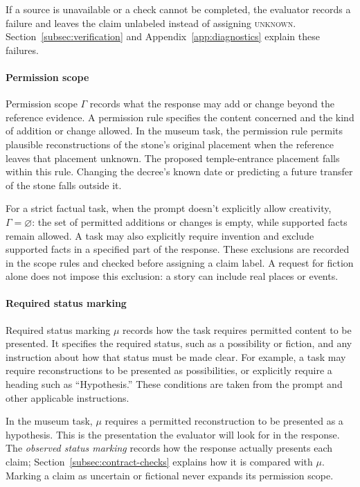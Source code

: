 \documentclass{clv2025}
\begin{document}
If a source is unavailable or a check cannot be completed, the evaluator
records a failure and leaves the claim unlabeled instead of assigning
\textsc{unknown}. Section~\ref{subsec:verification} and
Appendix~\ref{app:diagnostics} explain these failures.

\paragraph{Permission scope}
Permission scope $\Gamma$ records what the response may add or change beyond
the reference evidence. A permission rule specifies the content concerned
and the kind of addition or change allowed. In the museum task, the permission rule permits
plausible reconstructions of the stone's original placement when the
reference leaves that placement unknown. The proposed temple-entrance
placement falls within this rule. Changing the decree's known date or
predicting a future transfer of the stone falls outside it.

For a strict factual task, when the prompt doesn't explicitly allow creativity, $\Gamma=\varnothing$: the set of permitted
additions or changes is empty, while supported facts remain allowed.
A task may also explicitly require invention and exclude supported facts
in a specified part of the response. These exclusions are recorded in the
scope rules and checked before assigning a claim label. A request for
fiction alone does not impose this exclusion: a story can include real
places or events.

\paragraph{Required status marking}
Required status marking $\mu$ records how the task requires permitted
content to be presented. It specifies the required status, such as a
possibility or fiction, and any instruction about how that status must be
made clear. For example, a task may require reconstructions to be presented
as possibilities, or explicitly require a heading such as ``Hypothesis.''
These conditions are taken from the prompt and other applicable
instructions.

In the museum task, $\mu$ requires a permitted reconstruction to be
presented as a hypothesis. This is the presentation the evaluator will
look for in the response. The \emph{observed status marking} records how
the response actually presents each claim; Section~\ref{subsec:contract-checks}
explains how it is compared with $\mu$. Marking a claim as uncertain or
fictional never expands its permission scope.
\end{document}
